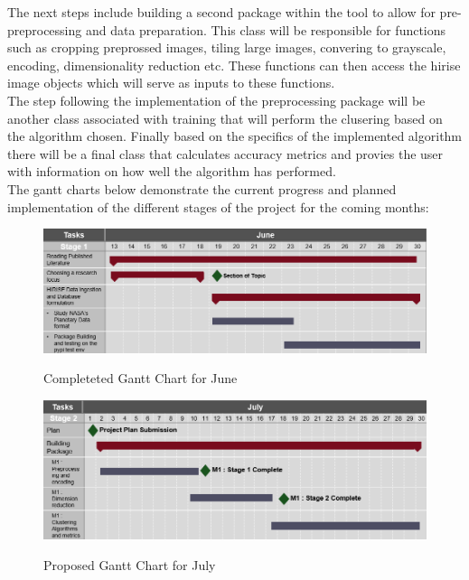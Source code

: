 \documentclass[project-plan]{report-template}
\begin{document}
 The next steps include building a second package within the tool to allow for pre-preprocessing and data preparation. This class will be responsible for functions such as cropping preprossed images, tiling large images, convering to grayscale, encoding, dimensionality reduction etc. These functions can then access the hirise image objects which will serve as inputs to these functions.\\
 The step following the implementation of the preprocessing package will be another class associated with training that will perform the clusering based on the algorithm chosen. Finally based on the specifics of the implemented algorithm there will be a final class that calculates accuracy metrics and provies the user with information on how well the algorithm has performed. \\

 The gantt charts below demonstrate the current progress and planned implementation of the different stages of the project for the coming months:

 \begin{figure}[htp]
    \begin{center}
        \includegraphics[width=1.1\textwidth]{gantt-june.png}
        \caption{}{Completeted Gantt Chart for June} 
    \end{center}
\end{figure}

\begin{figure}[htp]
    \begin{center}
        \includegraphics[width=1.1\textwidth]{gantt-july.png}
        \caption{}{Proposed Gantt Chart for July} 
    \end{center}
\end{figure}
\end{document}
